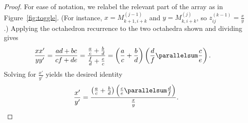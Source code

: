 \begin{proof} For ease of notation, we relabel the relevant part of the array as in Figure~\ref{fig:toggle}. (For instance, $x = M_{k+1,i+k}^{(j-1)}$ and $y = M_{k,i+k}^{(j)}$, so $z_{ij}^{(k-1)} = \frac{x}{y}$.) Applying the octahedron recurrence to the two octahedra shown and dividing gives
\begin{align*}
    \frac{xx'}{yy'} &= \frac{ad+bc}{cf+de} 
= \frac{\frac{a}{c} + \frac{b}{d}}{\frac{f}{d} + \frac{e}{c}}
    = \left( \frac{a}{c} + \frac{b}{d} \right) \left(\frac{d}{f} \parallelsum  \frac{c}{e} \right).  
\end{align*}
Solving for $\frac{x'}{y'}$ yields the desired identity
\[\frac{x'}{y'}=  \frac{\left( \frac{a}{c} + \frac{b}{d} \right) \left(\frac{c}{e} \parallelsum  \frac{d}{f} \right)}{\frac xy}.\qedhere\]
\end{proof}


